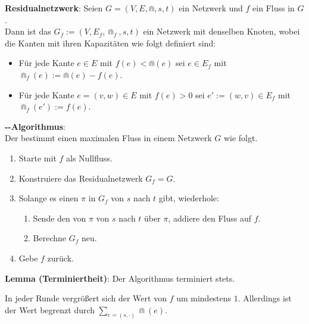 \textbf{Residualnetzwerk}:
Seien $G = (V, E, \Cap, s, t)$ ein Netzwerk und $f$ ein Fluss in $G$.\\
Dann ist das  $G_f := (V, E_f, \Cap_f, s, t)$ ein Netzwerk
mit denselben Knoten, wobei die Kanten mit ihren Kapazitäten wie folgt definiert sind:
\begin{itemize}
    \item
    Für jede Kante $e \in E$ mit $f(e) < \Cap(e)$ sei
    $e \in E_f$ mit $\Cap_f(e) := \Cap(e) - f(e)$.

    \item
    Für jede Kante $e = (v, w) \in E$ mit $f(e) > 0$ sei
    $e' := (w, v) \in E_f$ mit $\Cap_f(e') := f(e)$.
\end{itemize}

\linie

\textbf{--Algorithmus}:\\
Der  bestimmt einen maximalen Fluss in einem Netzwerk
$G$ wie folgt.
\begin{enumerate}
    \item
    Starte mit $f$ als Nullfluss.

    \item
    Konstruiere das Residualnetzwerk $G_f = G$.

    \item
    Solange es einen  $\pi$ in $G_f$ von $s$ nach $t$ gibt,
    wiederhole:
    \begin{enumerate}
        \item
        Sende den  von $\pi$ von $s$ nach $t$ über $\pi$,
        addiere den Fluss auf $f$.

        \item
        Berechne $G_f$ neu.
    \end{enumerate}

    \item
    Gebe $f$ zurück.
\end{enumerate}

\textbf{Lemma (Terminiertheit)}:
Der Algorithmus terminiert stets.

\begin{Beweis}
    In jeder Runde vergrößert sich der Wert von $f$ um mindestens $1$.
    Allerdings ist der Wert begrenzt durch $\sum_{e = (s, \cdot)} \Cap(e)$.
\end{Beweis}

\linie
\pagebreak

